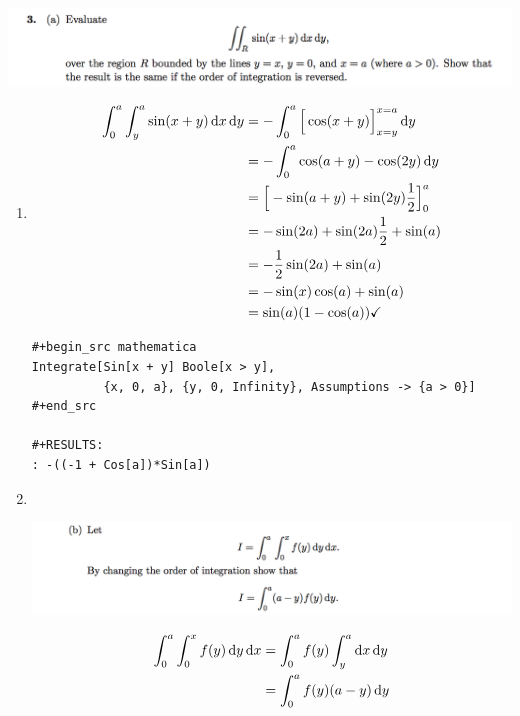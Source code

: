 \newpage
\subsection{}
\begin{mdframed}
  \includegraphics[width=400pt]{img/oxford-prelims-M5-multivariable-calc-1-3-a.png}
\end{mdframed}

\begin{enumerate}[label=(\alph*)]
\item
  \begin{align*}
    \int_0^a \int_y^a \sin(x + y) \dx \dy
    &= -\int_0^a \Big[\cos(x + y)\Big]_{x=y}^{x=a} \dy\\
    &= -\int_0^a \cos(a + y) - \cos(2y) \dy\\
    &= \Big[-\sin(a + y) + \sin(2y)\frac{1}{2}\Big]_0^a \\
    &= -\sin(2a) + \sin(2a)\frac{1}{2} + \sin(a)\\
    &= -\frac{1}{2}\sin(2a) + \sin(a)\\
    &= -\sin(x)\cos(a) + \sin(a)\\
    &= \sin(a)(1 - \cos(a)) \checkmark
  \end{align*}

\begin{verbatim}
#+begin_src mathematica
Integrate[Sin[x + y] Boole[x > y],
          {x, 0, a}, {y, 0, Infinity}, Assumptions -> {a > 0}]
#+end_src

#+RESULTS:
: -((-1 + Cos[a])*Sin[a])

\end{verbatim}

  \newpage
\item~\\
  \begin{mdframed}
    \includegraphics[width=400pt]{img/oxford-prelims-M5-multivariable-calc-1-3-b.png}
  \end{mdframed}
  \begin{align*}
    \int_0^a\int_0^x f(y) \dy \dx
    &= \int_0^a f(y) \int_y^a \dx \dy\\
    &= \int_0^a f(y) (a - y) \dy\\
  \end{align*}
\end{enumerate}

